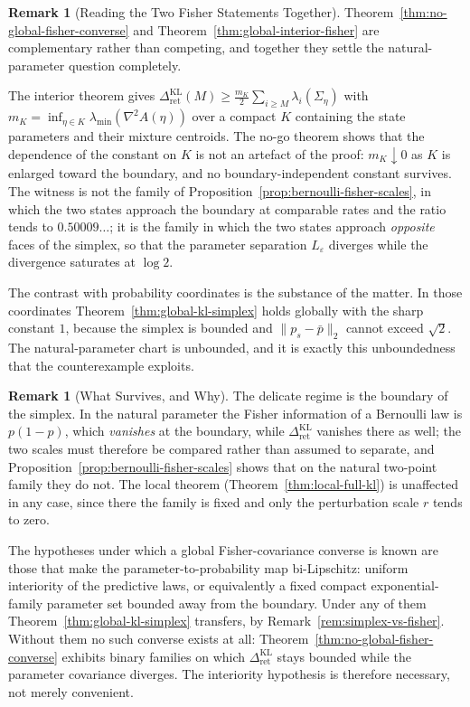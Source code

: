 \documentclass[12pt]{article}
\theoremstyle{definition}
\newtheorem{remark}[theorem]{Remark}
\newcommand{\RetKL}{\Delta_{\mathrm{ret}}^{\mathrm{KL}}}
\begin{document}
\begin{remark}[Reading the Two Fisher Statements Together]
\label{rem:fisher-nogo-reading}
Theorem~\ref{thm:no-global-fisher-converse} and
Theorem~\ref{thm:global-interior-fisher} are complementary rather than
competing, and together they settle the natural-parameter question completely.

The interior theorem gives $\RetKL(M)\ge\frac{m_K}{2}\sum_{i\ge M}
\lambda_i(\Sigma_\eta)$ with $m_K=\inf_{\eta\in K}\lambda_{\min}(\nabla^2A(\eta))$
over a compact $K$ containing the state parameters and their mixture
centroids.  The no-go theorem shows that the dependence of the constant on $K$
is not an artefact of the proof: $m_K\downarrow0$ as $K$ is enlarged toward the
boundary, and no boundary-independent constant survives.  The witness is not
the family of Proposition~\ref{prop:bernoulli-fisher-scales}, in which the two
states approach the boundary at comparable rates and the ratio tends to
$0.50009\ldots$; it is the family in which the two states approach
\emph{opposite} faces of the simplex, so that the parameter separation
$L_\varepsilon$ diverges while the divergence saturates at $\log2$.

The contrast with probability coordinates is the substance of the matter.  In
those coordinates Theorem~\ref{thm:global-kl-simplex} holds globally with the
sharp constant $1$, because the simplex is bounded and $\|p_s-\bar p\|_2$
cannot exceed $\sqrt2$.  The natural-parameter chart is unbounded, and it is
exactly this unboundedness that the counterexample exploits.
\end{remark}

\begin{remark}[What Survives, and Why]
\label{rem:global-kl-what-survives}
The delicate regime is the boundary of the simplex.  In the natural parameter
the Fisher information of a Bernoulli law is $p(1-p)$, which \emph{vanishes} at
the boundary, while $\RetKL$ vanishes there as well; the two scales must
therefore be compared rather than assumed to separate, and
Proposition~\ref{prop:bernoulli-fisher-scales} shows that on the natural
two-point family they do not.  The local theorem
(Theorem~\ref{thm:local-full-kl}) is unaffected in any case, since there the
family is fixed and only the perturbation scale $r$ tends to zero.

The hypotheses under which a global Fisher-covariance converse is known are
those that make the parameter-to-probability map bi-Lipschitz: uniform
interiority of the predictive laws, or equivalently a fixed compact
exponential-family parameter set bounded away from the boundary.  Under any of
them Theorem~\ref{thm:global-kl-simplex} transfers, by
Remark~\ref{rem:simplex-vs-fisher}.  Without them no such converse exists at
all: Theorem~\ref{thm:no-global-fisher-converse} exhibits binary families on
which $\RetKL$ stays bounded while the parameter covariance diverges.  The
interiority hypothesis is therefore necessary, not merely convenient.
\end{remark}
\end{document}
